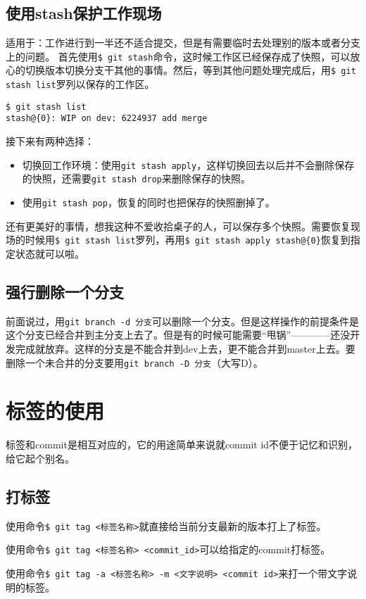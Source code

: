 \documentclass[UTF8]{ctexart}
\begin{document}
\subsection{使用stash保护工作现场}
适用于：工作进行到一半还不适合提交，但是有需要临时去处理别的版本或者分支上的问题。
首先使用\verb!$ git stash!命令，这时候工作区已经保存成了快照，可以放心的切换版本切换分支干其他的事情。然后，等到其他问题处理完成后，用\verb!$ git stash list!罗列以保存的工作区。
\begin{lstlisting}[caption=bash command]
$ git stash list
stash@{0}: WIP on dev: 6224937 add merge
\end{lstlisting}

接下来有两种选择：
\begin{itemize}
\item 切换回工作环境：使用\verb!git stash apply!，这样切换回去以后并不会删除保存的快照，还需要\verb!git stash drop!来删除保存的快照。
\item 使用\verb!git stash pop!，恢复的同时也把保存的快照删掉了。
\end{itemize}

还有更美好的事情，想我这种不爱收拾桌子的人，可以保存多个快照。需要恢复现场的时候用\verb!$ git stash list!罗列，再用\verb!$ git stash apply stash@{0}!恢复到指定状态就可以啦。

\subsection{强行删除一个分支}
前面说过，用\verb!git branch -d 分支!可以删除一个分支。但是这样操作的前提条件是这个分支已经合并到主分支上去了。但是有的时候可能需要“甩锅”————还没开发完成就放弃。这样的分支是不能合并到dev上去，更不能合并到master上去。要删除一个未合并的分支要用\verb!git branch -D 分支!（大写D）。

\section{标签的使用}
标签和commit是相互对应的，它的用途简单来说就commit id不便于记忆和识别，给它起个别名。
\subsection{打标签}
使用命令\verb!$ git tag <标签名称>!就直接给当前分支最新的版本打上了标签。

使用命令\verb!$ git tag <标签名称> <commit_id>!可以给指定的commit打标签。

使用命令\verb!$ git tag -a <标签名称> -m <文字说明> <commit id>!来打一个带文字说明的标签。
\end{document}
